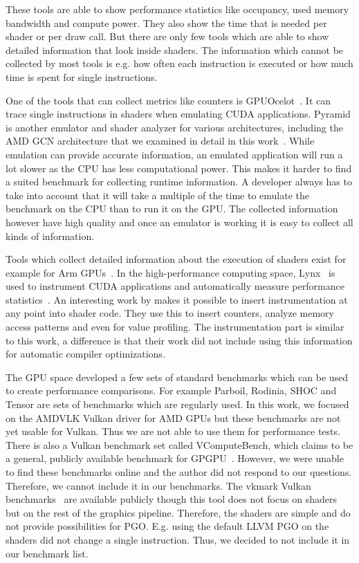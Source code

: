 These tools are able to show performance statistics like occupancy, used memory bandwidth and compute power.
They also show the time that is needed per shader or per draw call.
But there are only few tools which are able to show detailed information that look inside shaders.
The information which cannot be collected by most tools is e.g. how often each instruction is executed or how much time is spent for single instructions.

One of the tools that can collect metrics like counters is GPUOcelot~\cite{GPUOcelot, Lakshminarayana2010}.
It can trace single instructions in shaders when emulating CUDA applications.
Pyramid is another emulator and shader analyzer for various architectures, including the AMD GCN architecture that we examined in detail in this work~\cite{Pyramid}.
While emulation can provide accurate information, an emulated application will run a lot slower as the CPU has less computational power.
This makes it harder to find a suited benchmark for collecting runtime information.
A developer always has to take into account that it will take a multiple of the time to emulate the benchmark on the CPU than to run it on the GPU.
The collected information however have high quality and once an emulator is working it is easy to collect all kinds of information.

Tools which collect detailed information about the execution of shaders exist for example for Arm GPUs~\cite{Barton2013}.
In the high-performance computing space, Lynx~\cite{Lynx} is used to instrument CUDA applications and automatically measure performance statistics~\cite{Farooqui2014}.
An interesting work by \citet{Stephenson2015} makes it possible to insert instrumentation at any point into shader code.
They use this to insert counters, analyze memory access patterns and even for value profiling.
The instrumentation part is similar to this work, a difference is that their work did not include using this information for automatic compiler optimizations.

The GPU space developed a few sets of standard benchmarks which can be used to create performance comparisons.
For example Parboil, Rodinia, SHOC and Tensor are sets of benchmarks which are regularly used.
In this work, we focused on the AMDVLK Vulkan driver for AMD GPUs but these benchmarks are not yet usable for Vulkan.
Thus we are not able to use them for performance tests.
There is also a Vulkan benchmark set called VComputeBench, which claims to be a general, publicly available benchmark for GPGPU~\cite{Mammeri2018}.
However, we were unable to find these benchmarks online and the author did not respond to our questions.
Therefore, we cannot include it in our benchmarks.
The vkmark Vulkan benchmarks~\cite{vkmark} are available publicly though this tool does not focus on shaders but on the rest of the graphics pipeline.
Therefore, the shaders are simple and do not provide possibilities for PGO.
E.g. using the default LLVM PGO on the shaders did not change a single instruction.
Thus, we decided to not include it in our benchmark list.

